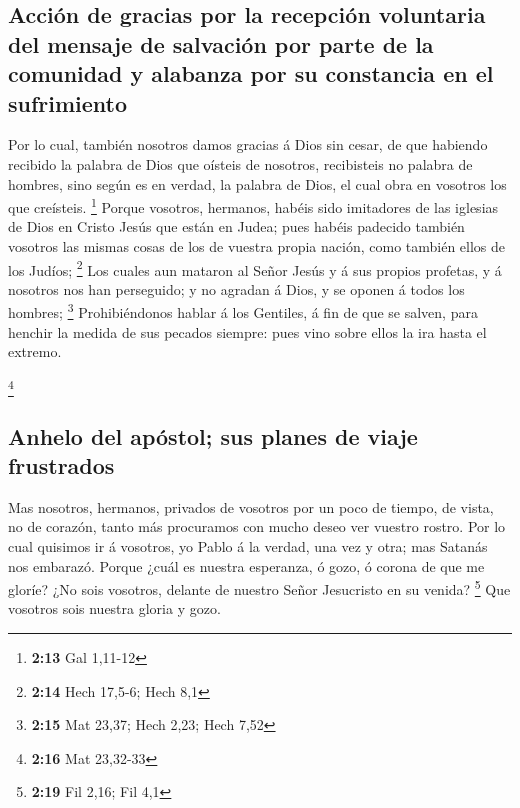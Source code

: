 \hypertarget{acciuxf3n-de-gracias-por-la-recepciuxf3n-voluntaria-del-mensaje-de-salvaciuxf3n-por-parte-de-la-comunidad-y-alabanza-por-su-constancia-en-el-sufrimiento}{%
\subsection{Acción de gracias por la recepción voluntaria del mensaje de
salvación por parte de la comunidad y alabanza por su constancia en el
sufrimiento}\label{acciuxf3n-de-gracias-por-la-recepciuxf3n-voluntaria-del-mensaje-de-salvaciuxf3n-por-parte-de-la-comunidad-y-alabanza-por-su-constancia-en-el-sufrimiento}}

 Por lo cual, también nosotros damos gracias á Dios sin
cesar, de que habiendo recibido la palabra de Dios que oísteis de
nosotros, recibisteis no palabra de hombres, sino según es en verdad, la
palabra de Dios, el cual obra en vosotros los que creísteis. \footnote{\textbf{2:13}
  Gal 1,11-12}  Porque vosotros, hermanos, habéis sido
imitadores de las iglesias de Dios en Cristo Jesús que están en Judea;
pues habéis padecido también vosotros las mismas cosas de los de vuestra
propia nación, como también ellos de los Judíos; \footnote{\textbf{2:14}
  Hech 17,5-6; Hech 8,1}  Los cuales aun mataron al Señor
Jesús y á sus propios profetas, y á nosotros nos han perseguido; y no
agradan á Dios, y se oponen á todos los hombres; \footnote{\textbf{2:15}
  Mat 23,37; Hech 2,23; Hech 7,52}  Prohibiéndonos hablar
á los Gentiles, á fin de que se salven, para henchir la medida de sus
pecados siempre: pues vino sobre ellos la ira hasta el extremo.

\footnote{\textbf{2:16} Mat 23,32-33}

\hypertarget{anhelo-del-apuxf3stol-sus-planes-de-viaje-frustrados}{%
\subsection{Anhelo del apóstol; sus planes de viaje
frustrados}\label{anhelo-del-apuxf3stol-sus-planes-de-viaje-frustrados}}

 Mas nosotros, hermanos, privados de vosotros por un poco
de tiempo, de vista, no de corazón, tanto más procuramos con mucho deseo
ver vuestro rostro.  Por lo cual quisimos ir á vosotros,
yo Pablo á la verdad, una vez y otra; mas Satanás nos embarazó.
 Porque ¿cuál es nuestra esperanza, ó gozo, ó corona de
que me gloríe? ¿No sois vosotros, delante de nuestro Señor Jesucristo en
su venida? \footnote{\textbf{2:19} Fil 2,16; Fil 4,1} 
Que vosotros sois nuestra gloria y gozo.

